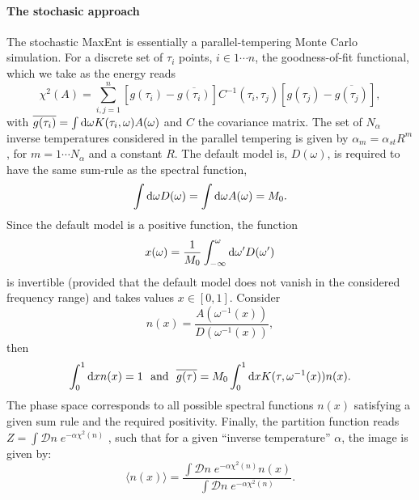 \paragraph*{The stochasic approach}
The stochastic MaxEnt is essentially a parallel-tempering Monte Carlo simulation.  For a discrete set 
of $\tau_i$ points,  $i \in 1 \cdots n $, the goodness-of-fit functional, which we take as the energy reads
\begin{equation}
  \chi^{2}(A) =  \sum_{i,j=1}^{n}   \left[ g(\tau_i)  -  \overline{g(\tau_i)} \right] C^{-1}(\tau_i,\tau_j) \left[    g(\tau_j)  -  \overline{g(\tau_j)} \right] ,
\end{equation}
with $ \overline{g(\tau_i)} =\int \mathrm{d}{\omega} K(\tau_{i},\omega)  A(\omega)$ and  $C$ the covariance matrix. 
The set of $N_{\alpha}$ inverse temperatures considered in the parallel tempering is given by
$ \alpha_m = \alpha_{st}  R^{m}$, for $m = 1 \cdots N_{\alpha} $ and a constant $R$.
The  default model  is, $D(\omega)$,  is   required  to  have  the  same  sum-rule  as  the  spectral  function,
\begin{equation}
  \int \mathrm{d}{\omega} D(\omega) =  \int \mathrm{d}{\omega} A(\omega) =  M_0. 
\end{equation}
Since   the    default  model is  a  positive    function,  the    function 
\begin{equation}
     x(\omega)  =   \frac{1}{M_0}\int_{-\infty}^{\omega} \mathrm{d}{\omega'}  D(\omega')  
\end{equation}
is  invertible  (provided  that  the  default model  does not  vanish  in the considered frequency  range) 
and   takes  values  $ x \in \left[ 0,1 \right] $. Consider 
\begin{equation}
      n(x)   =  \frac{A(\omega^{-1}(x))}{D(\omega^{-1}(x))},
\end{equation}
then 
\begin{equation}
    \int_{0}^{1} \mathrm{d}{x} n(x)  = 1   \, \,  \text{ and } \, \,  
    \overline{g(\tau)} = M_0 \int_{0}^{1} \mathrm{d}{x} K(\tau,\omega^{-1}(x))  n(x).
\end{equation}
The phase space corresponds to 
all possible spectral functions $n(x)$ satisfying a given sum rule and the required positivity. 
 Finally, the partition function reads
$Z =  \int\mathcal{D}\!n\; e^{-\alpha \chi^{2}(n)}$ \cite{Beach04a}, such that for a given ``inverse temperature'' $\alpha$, the image is given by: 
\begin{equation}
  \label{eqn:Stoch_MaxEnt}
  \langle n (x ) \rangle  =   \frac{\int\mathcal{D}\!n\; e^{-\alpha \chi^{2}(n)}  n(x) }
         { \int\mathcal{D}\!n\; e^{-\alpha \chi^{2}(n)}  }.
\end{equation}
